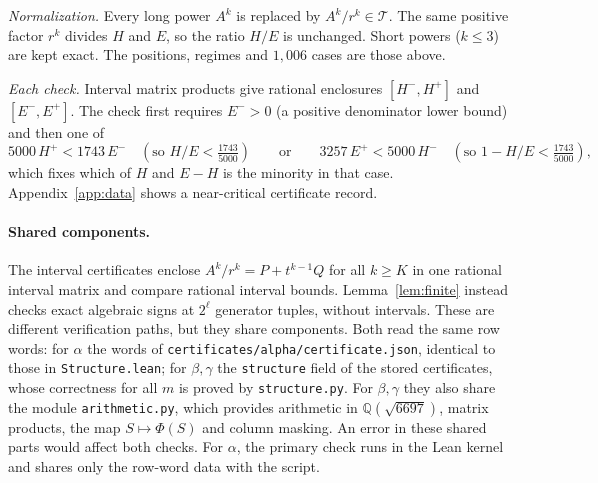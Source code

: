 \documentclass[11pt]{amsart}
\theoremstyle{definition}
\theoremstyle{remark}
\begin{document}
\emph{Normalization.} Every long power $A^k$ is replaced by $A^k/r^k\in\mathcal T$. The same positive factor $r^k$ divides $H$ and $E$, so the ratio $H/E$ is unchanged. Short powers ($k\le3$) are kept exact. The positions, regimes and $1{,}006$ cases are those above.

\emph{Each check.} Interval matrix products give rational enclosures $[H^-,H^+]$ and $[E^-,E^+]$. The check first requires $E^->0$ (a positive denominator lower bound) and then one of
\[
5000\,H^+<1743\,E^- \quad(\text{so }H/E<\tfrac{1743}{5000})
\qquad\text{or}\qquad
3257\,E^+<5000\,H^- \quad(\text{so }1-H/E<\tfrac{1743}{5000}),
\]
which fixes which of $H$ and $E-H$ is the minority in that case. Appendix~\ref{app:data} shows a near-critical certificate record.

\paragraph{Shared components.} The interval certificates enclose $A^k/r^k=P+t^{k-1}Q$ for all $k\ge K$ in one rational interval matrix and compare rational interval bounds. Lemma~\ref{lem:finite} instead checks exact algebraic signs at $2^\ell$ generator tuples, without intervals. These are different verification paths, but they share components. Both read the same row words: for $\alpha$ the words of \texttt{certificates/alpha/certificate.json}, identical to those in \texttt{Structure.lean}; for $\beta,\gamma$ the \texttt{structure} field of the stored certificates, whose correctness for all $m$ is proved by \texttt{structure.py}. For $\beta,\gamma$ they also share the module \texttt{arithmetic.py}, which provides arithmetic in $\mathbb{Q}(\sqrt{6697})$, matrix products, the map $S\mapsto\Phi(S)$ and column masking. An error in these shared parts would affect both checks. For $\alpha$, the primary check runs in the Lean kernel and shares only the row-word data with the script.
\end{document}
